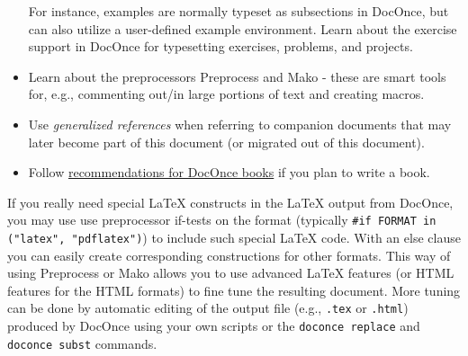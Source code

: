 \documentclass[%
oneside,                 %
final,                   %
10pt]{article}
\newcounter{doconce:movie:counter}
\newenvironment{notice_mdfboxadmon}[1][]{
\begin{notice_mdfboxmdframed}[frametitle=#1]
}
{
\end{notice_mdfboxmdframed}
}
\begin{document}
\begin{itemize}
   For instance, examples are normally typeset as subsections in DocOnce,
   but can also utilize a user-defined example environment.
   Learn about the exercise support in DocOnce for typesetting
   exercises, problems, and projects.
 \item Learn about the preprocessors Preprocess and Mako - these are smart
   tools for, e.g., commenting out/in large portions of text and creating
   macros.
 \item Use \emph{generalized references} when referring to companion documents
   that may later become part of this document (or migrated out of this document).
 \item Follow \href{{https://github.com/doconce/setup4book-doconce}}{recommendations for DocOnce books} if you plan to write a book.
\end{itemize}
\noindent

\begin{notice_mdfboxadmon}
If you really need special {\LaTeX} constructs in the {\LaTeX} output
from DocOnce, you may use use preprocessor if-tests on
the format (typically \Verb!#if FORMAT in ("latex", "pdflatex")!) to
include such special {\LaTeX} code. With an else clause you can easily
create corresponding constructions for other formats. This way
of using Preprocess or Mako
allows you to use advanced {\LaTeX} features (or HTML features for the HTML formats)
to fine tune the resulting
document. More tuning can be done by automatic editing of the
output file (e.g., \texttt{.tex} or \texttt{.html}) produced by DocOnce using
your own scripts or the \texttt{doconce replace} and \texttt{doconce subst} commands.
\end{notice_mdfboxadmon} %
\end{document}
